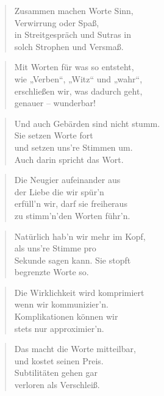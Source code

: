 \documentclass[10pt,a4paper]{article}
\begin{document}
\begin{multicols}{2}
\begin{verse}
Zusammen machen Worte Sinn, \\
Verwirrung oder Spaß, \\
in Streitgespräch und Sutras in \\
solch Strophen und Versmaß. \\
\end{verse}

\begin{verse}
Mit Worten für was so entsteht, \\
wie „Verben“, „Witz“ und „wahr“, \\
erschließen wir, was dadurch geht, \\
genauer – wunderbar! \\
\end{verse}

\begin{verse}
Und auch Gebärden sind nicht stumm. \\
Sie setzen Worte fort \\
und setzen uns’re Stimmen um. \\
Auch darin spricht das Wort. \\
\end{verse}

\begin{verse}
Die Neugier aufeinander aus \\
der Liebe die wir spür’n \\
erfüll’n wir, darf sie freiheraus \\
zu stimm’n’den Worten führ’n. \\
\end{verse}

\begin{verse}
Natürlich hab’n wir mehr im Kopf, \\
als uns’re Stimme pro \\
Sekunde sagen kann. Sie stopft \\
begrenzte Worte so. \\
\end{verse}

\begin{verse}
Die Wirklichkeit wird komprimiert \\
wenn wir kommunizier’n. \\
Komplikationen können wir \\
stets nur approximier’n. \\
\end{verse}

\begin{verse}
Das macht die Worte mitteilbar, \\
und kostet seinen Preis. \\
Subtilitäten gehen gar \\
verloren als Verschleiß. \\
\end{verse}


\end{multicols}
\end{document}
